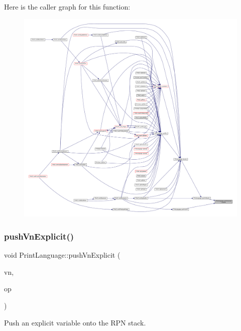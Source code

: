 Here is the caller graph for this function\+:
\nopagebreak
\begin{figure}[H]
\begin{center}
\leavevmode
\includegraphics[width=350pt]{class_print_language_a16ffa214e32d7815a1350752a0113796_icgraph}
\end{center}
\end{figure}
\mbox{\label{class_print_language_a6ec07b77be217d86b77ec5fec2919b08}} 
\subsubsection{\texorpdfstring{pushVnExplicit()}{pushVnExplicit()}}
{\footnotesize\ttfamily void Print\+Language\+::push\+Vn\+Explicit (\begin{DoxyParamCaption}\item[{const \mbox{\hyperlink{class_varnode}{Varnode}} $\ast$}]{vn,  }\item[{const \mbox{\hyperlink{class_pcode_op}{Pcode\+Op}} $\ast$}]{op }\end{DoxyParamCaption})\hspace{0.3cm}{\ttfamily [protected]}}



Push an explicit variable onto the R\+PN stack. 

